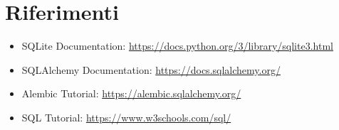 \section{Riferimenti}
\begin{itemize}
  \item SQLite Documentation: \url{https://docs.python.org/3/library/sqlite3.html}
  \item SQLAlchemy Documentation: \url{https://docs.sqlalchemy.org/}
  \item Alembic Tutorial: \url{https://alembic.sqlalchemy.org/}
  \item SQL Tutorial: \url{https://www.w3schools.com/sql/}
\end{itemize}
